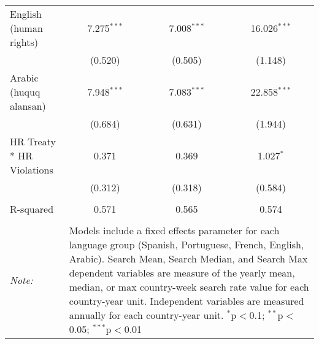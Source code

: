 \begin{table}[!htbp]
\begin{tabular}{@{\extracolsep{5pt}}lccc}
  English (human rights) & 7.275$^{***}$ & 7.008$^{***}$ & 16.026$^{***}$ \\ 
  & (0.520) & (0.505) & (1.148) \\ 
  Arabic (huquq alansan) & 7.948$^{***}$ & 7.083$^{***}$ & 22.858$^{***}$ \\ 
  & (0.684) & (0.631) & (1.944) \\ 
  HR Treaty * HR Violations & 0.371 & 0.369 & 1.027$^{*}$ \\ 
  & (0.312) & (0.318) & (0.584) \\ 
 \hline \\[-1.8ex] 
R-squared  & 0.571 & 0.565 & 0.574 \\ 
\hline 
\hline \\[-1.8ex] 
\textit{Note:}  & \multicolumn{3}{l}{\parbox[t]{8cm}{Models include a fixed effects parameter for each language group (Spanish, Portuguese, French, English, Arabic). Search Mean, Search Median, and Search Max dependent variables are measure of the yearly mean, median, or max country-week search rate value for each country-year unit. Independent variables are measured annually for each country-year unit. $^{*}$p$<$0.1; $^{**}$p$<$0.05; $^{***}$p$<$0.01}} \\ 
\end{tabular} 
\end{table} 
